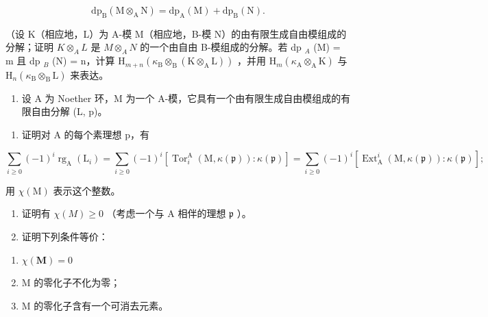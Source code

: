 \[
\mathrm{dp} _ {\mathrm{B}} (\mathrm{M} \otimes_ {\mathrm{A}} \mathrm{N}) = \mathrm{dp} _ {\mathrm{A}} (\mathrm{M}) + \mathrm{dp} _ {\mathrm{B}} (\mathrm{N}).
\]

（设 K（相应地，L）为 A-模 M（相应地，B-模 N）的由有限生成自由模组成的分解；证明 \(K \otimes_{A} L\) 是 \(M \otimes_{A} N\) 的一个由自由 B-模组成的分解。若 dp \(_{A}\) (M) = m 且 dp \(_{B}\) (N) = n，计算 \(\mathrm{H}_{m+n}(\kappa_{\mathrm{B}} \otimes_{\mathrm{B}} (\mathrm{K} \otimes_{\mathrm{A}} \mathrm{L}))\) ，并用 \(\mathrm{H}_{m}(\kappa_{\mathrm{A}} \otimes_{\mathrm{A}} \mathrm{K})\) 与 \(\mathrm{H}_{n}(\kappa_{\mathrm{B}} \otimes_{\mathrm{B}} \mathrm{L})\) 来表达。

\begin{enumerate}
\def\labelenumi{\arabic{enumi})}
\setcounter{enumi}{1}
\tightlist
\item
  设 A 为 Noether 环，M 为一个 A-模，它具有一个由有限生成自由模组成的有限自由分解 (L, p)。
\end{enumerate}

\begin{enumerate}
\def\labelenumi{\alph{enumi})}
\tightlist
\item
  证明对 A 的每个素理想 p，有
\end{enumerate}

\[
\sum_ {i \geqslant 0} (- 1) ^ {i} \operatorname{rg} _ {\mathrm{A}} (\mathrm{L} _ {i}) = \sum_ {i \geqslant 0} (- 1) ^ {i} \left[ \operatorname{Tor} _ {i} ^ {\mathrm{A}} (\mathrm{M}, \kappa (\mathfrak {p})): \kappa (\mathfrak {p}) \right] = \sum_ {i \geqslant 0} (- 1) ^ {i} \left[ \operatorname{Ext} _ {\mathrm{A}} ^ {i} (\mathrm{M}, \kappa (\mathfrak {p})): \kappa (\mathfrak {p}) \right];
\]

用 \(\chi(\mathrm{M})\) 表示这个整数。

\begin{enumerate}
\def\labelenumi{\alph{enumi})}
\setcounter{enumi}{1}
\item
  证明有 \(\chi(M) \geqslant 0\) （考虑一个与 A 相伴的理想 \(\mathfrak{p}\) ）。
\item
  证明下列条件等价：
\end{enumerate}

\begin{enumerate}
\def\labelenumi{(\roman{enumi})}
\item
  \(\chi (\mathbf{M}) = 0\)
\item
  M 的零化子不化为零；
\item
  M 的零化子含有一个可消去元素。
\end{enumerate}


